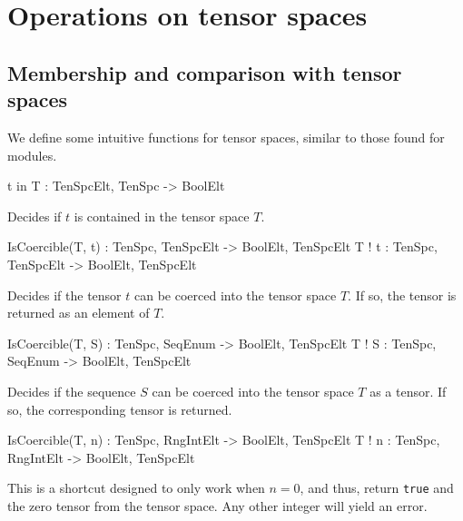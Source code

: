 \section{Operations on tensor spaces}

\subsection{Membership and comparison with tensor spaces}

We define some intuitive functions for tensor spaces, similar to those found for modules.

\begin{intrinsics}
t in T : TenSpcElt, TenSpc -> BoolElt
\end{intrinsics}

Decides if $t$ is contained in the tensor space $T$.

\begin{intrinsics}
IsCoercible(T, t) : TenSpc, TenSpcElt -> BoolElt, TenSpcElt
T ! t : TenSpc, TenSpcElt -> BoolElt, TenSpcElt
\end{intrinsics}

Decides if the tensor $t$ can be coerced into the tensor space $T$. If so, the tensor is returned as an element of $T$.

\begin{intrinsics}
IsCoercible(T, S) : TenSpc, SeqEnum -> BoolElt, TenSpcElt
T ! S : TenSpc, SeqEnum -> BoolElt, TenSpcElt
\end{intrinsics}

Decides if the sequence $S$ can be coerced into the tensor space $T$ as a tensor. If so, the corresponding tensor is returned. 

\begin{intrinsics}
IsCoercible(T, n) : TenSpc, RngIntElt -> BoolElt, TenSpcElt
T ! n : TenSpc, RngIntElt -> BoolElt, TenSpcElt
\end{intrinsics}

This is a shortcut designed to only work when $n=0$, and thus, return {\tt true} and the zero tensor from the tensor space. 
Any other integer will yield an error.

